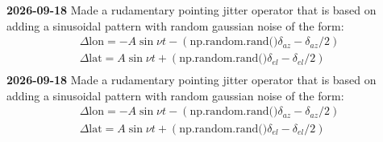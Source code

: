 {\bf 2026-09-18}
Made a rudamentary pointing jitter operator that is based on adding a sinusoidal pattern with random gaussian noise of the form:
 \begin{equation}
    \begin{split}
        \Delta \text{lon} = - A \sin{\nu t} - (\text{np.random.rand()}\delta_{az} - \delta_{az}/2) \\
        \Delta \text{lat} = A \sin{\nu t} + (\text{np.random.rand()}\delta_{el} - \delta_{el}/2) \\
    \end{split}
\end{equation}{\bf 2026-09-18}
Made a rudamentary pointing jitter operator that is based on adding a sinusoidal pattern with random gaussian noise of the form:
 \begin{equation}
    \begin{split}
        \Delta \text{lon} = - A \sin{\nu t} - (\text{np.random.rand()}\delta_{az} - \delta_{az}/2) \\
        \Delta \text{lat} = A \sin{\nu t} + (\text{np.random.rand()}\delta_{el} - \delta_{el}/2) \\
    \end{split}
\end{equation}